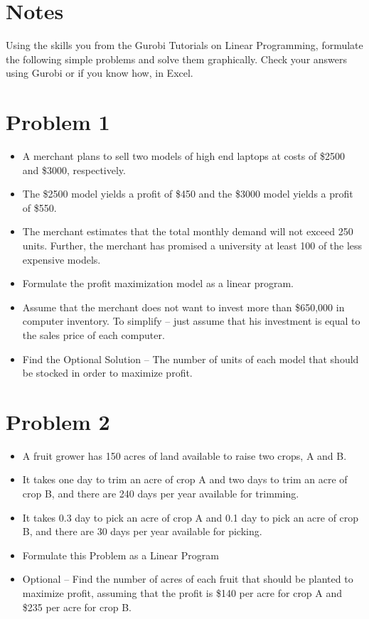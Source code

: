 \documentclass[12pt,letterpaper]{article}
\begin{document}
\section*{Notes}
Using the skills you  from the Gurobi Tutorials on Linear Programming, formulate the following simple problems and solve them graphically. Check your answers using Gurobi or if you know how, in Excel. 

\section*{Problem 1}

\begin{itemize}
    \item A merchant  plans  to  sell  two  models  of high end laptops  at 
costs of \$2500 and \$3000, respectively.
\item The \$2500 model yields a
profit  of  \$450  and  the  \$3000  model  yields  a  profit  of  \$550. 
\item The merchant  estimates  that  the  total  monthly  demand will not exceed 250 units. Further, the merchant has promised a university at least 100 of the less expensive models. 
\item Formulate the profit maximization model as a linear program. 
\item Assume  that
the  merchant  does  not  want  to  invest  more  than  \$650,000  in
computer inventory. To simplify -- just assume that his investment is equal to the sales price of each computer. 
\item Find the Optional Solution -- The number of units of each model that should  be  stocked  in  order  to  maximize  profit.  

\end{itemize}   

\newpage
\section*{Problem 2}

\begin{itemize}

\item A fruit  grower  has  150  acres  of  land  available  to  raise two crops, A and B. 
\item It takes one day to trim an acre of crop A and two days to trim an acre of crop B, and there are 240 days per year available for trimming. 
\item It takes 0.3 day to pick an acre of
crop A and 0.1 day to pick an acre of crop B, and there are 30 days  per  year  available  for  picking.  
\item Formulate this Problem as a Linear Program 
\item Optional -- Find  the  number  of  acres of each fruit that should be planted to maximize profit,  assuming  that  the  profit is \$140  per  acre  for  crop A and  \$235
per acre for crop B.

\end{itemize}
\end{document}
